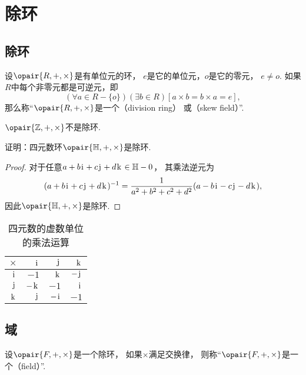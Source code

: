 \section{除环}
\subsection{除环}
\begin{definition}
设\(\opair{R,+,\times}\)是有单位元的环，
\(e\)是它的单位元，\(o\)是它的零元，
\(e \neq o\).
如果\(R\)中每个非零元都是可逆元，即\begin{equation*}
	(\forall a \in R-\{o\})(\exists b \in R)[a \times b = b \times a = e],
\end{equation*}
那么称“\(\opair{R,+,\times}\)是一个（division ring）
或（skew field）”.
\end{definition}

\(\opair{\mathbb{Z},+,\times}\)不是除环.

\begin{example}
证明：四元数环\(\opair{\mathbb{H},+,\times}\)是除环.
\begin{proof}
对于任意\(a+b\kern1pt\mathrm{i}\kern1pt+c\kern1pt\mathrm{j}\kern1pt+d\kern1pt\mathrm{k}\kern1pt\in\mathbb{H}-0\)，
其乘法逆元为\begin{equation*}
	(a+b\kern1pt\mathrm{i}\kern1pt+c\kern1pt\mathrm{j}\kern1pt+d\kern1pt\mathrm{k}\kern1pt)^{-1}
	= \frac1{a^2+b^2+c^2+d^2} (a-b\kern1pt\mathrm{i}\kern1pt-c\kern1pt\mathrm{j}\kern1pt-d\kern1pt\mathrm{k}\kern1pt),
\end{equation*}
因此\(\opair{\mathbb{H},+,\times}\)是除环.
\end{proof}
\end{example}

\begin{table}[hbt]
	\centering
	\begin{tabular}{r|*3r}
		\(\times\) & \(\kern1pt\mathrm{i}\kern1pt\) & \(\kern1pt\mathrm{j}\kern1pt\) & \(\kern1pt\mathrm{k}\kern1pt\) \\ \hline
		\(\kern1pt\mathrm{i}\kern1pt\) & \(-1\) & \(\kern1pt\mathrm{k}\kern1pt\) & \(-\kern1pt\mathrm{j}\kern1pt\) \\
		\(\kern1pt\mathrm{j}\kern1pt\) & \(-\kern1pt\mathrm{k}\kern1pt\) & \(-1\) & \(\kern1pt\mathrm{i}\kern1pt\) \\
		\(\kern1pt\mathrm{k}\kern1pt\) & \(\kern1pt\mathrm{j}\kern1pt\) & \(-\kern1pt\mathrm{i}\kern1pt\) & \(-1\) \\
	\end{tabular}
	\caption{四元数的虚数单位的乘法运算}
\end{table}

\subsection{域}
\begin{definition}
设\(\opair{F,+,\times}\)是一个除环，
如果\(\times\)满足交换律，
则称“\(\opair{F,+,\times}\)是一个（field）”.
\end{definition}

